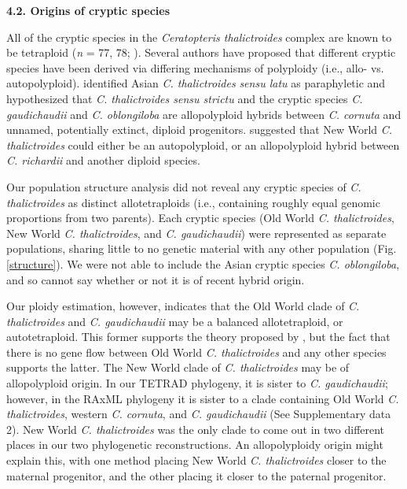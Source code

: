\documentclass[12pt]{article}
\begin{document}
\begin{flushleft}
\textbf{4.2. Origins of cryptic species}

All of the cryptic species in the \textit{Ceratopteris thalictroides} complex are known to be tetraploid (\textit{n} = 77, 78; \cite{Masuyama2010}). Several authors have proposed that different cryptic species have been derived via differing mechanisms of polyploidy (i.e., allo- vs. autopolyploid). \textcite{Adjie2007} identified Asian \textit{C. thalictroides} \textit{sensu latu} as paraphyletic and hypothesized that \textit{C. thalictroides sensu strictu} and the cryptic species \textit{C. gaudichaudii} and \textit{C. oblongiloba} are allopolyploid hybrids between \textit{C. cornuta} and unnamed, potentially extinct, diploid progenitors. \textcite{McGrath1994} suggested that New World \textit{C. thalictroides} could either be an autopolyploid, or an allopolyploid hybrid between \textit{C. richardii} and another diploid species.

Our population structure analysis did not reveal any cryptic species of \textit{C. thalictroides} as distinct allotetraploids (i.e., containing roughly equal genomic proportions from two parents). Each cryptic species (Old World \textit{C. thalictroides}, New World \textit{C. thalictroides}, and \textit{C. gaudichaudii}) were represented as separate populations, sharing little to no genetic material with any other population (Fig. \ref{structure}). We were not able to include the Asian cryptic species \textit{C. oblongiloba}, and so cannot say whether or not it is of recent hybrid origin. 

Our ploidy estimation, however, indicates that the Old World clade of \textit{C. thalictroides} and \textit{C. gaudichaudii} may be a balanced allotetraploid, or autotetraploid. This former supports the theory proposed by \textcite{Adjie2007}, but the fact that there is no gene flow between Old World \textit{C. thalictroides} and any other species supports the latter. The New World clade of \textit{C. thalictroides} may be of allopolyploid origin. In our {\small{TETRAD}} phylogeny, it is sister to \textit{C. gaudichaudii}; however, in the {\small{RAxML}} phylogeny it is sister to a clade containing Old World \textit{C. thalictroides}, western \textit{C. cornuta}, and \textit{C. gaudichaudii} (See Supplementary data 2). New World \textit{C. thalictroides} was the only clade to come out in two different places in our two phylogenetic reconstructions. An allopolyploidy origin might explain this, with one method placing New World \textit{C. thalictroides} closer to the maternal progenitor, and the other placing it closer to the paternal progenitor.


\end{flushleft}
\end{document}

